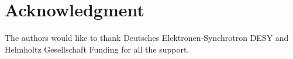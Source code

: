 \documentclass[journal]{IEEEtran}
\begin{document}
\section*{Acknowledgment}
The authors would like to thank Deutsches Elektronen-Synchrotron DESY and Helmholtz Gesellschaft Funding for all the support.

\ifCLASSOPTIONcaptionsoff
  \newpage
\fi




\end{document}
